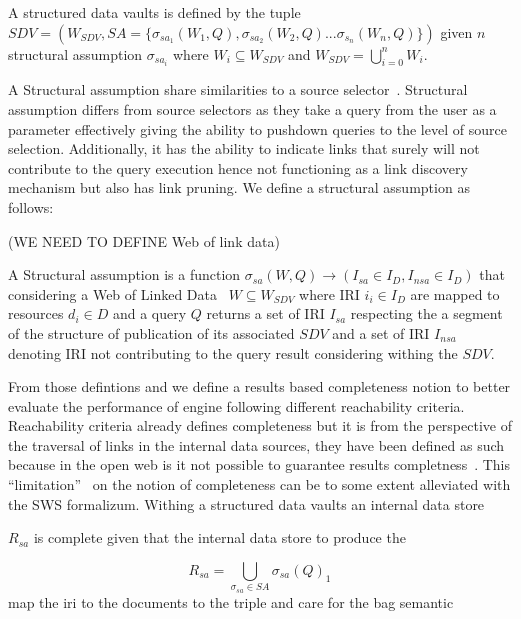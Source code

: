 \begin{definition}\label{def:structuredDataVaults}
A structured data vaults is defined by the tuple~\newline $SDV = (W_{SDV}, SA = \{\sigma_{sa_1}(W_1, Q), \sigma_{sa_2}(W_2, Q)...\sigma_{s_n}(W_n, Q)\})$ given 
$n$ structural assumption $\sigma_{sa_i}$ where $W_i  \subseteq W_{SDV}$ and $W_{SDV} = \bigcup_{i=0}^{n}W_i$.
\end{definition}

A Structural assumption share similarities to a source selector~\cite{Bogaerts2021LinkTW}.
Structural assumption differs from source selectors as they take a query from the user as a parameter
effectively giving the ability to pushdown queries to the level of source selection.
Additionally, it has the ability to indicate links that surely will not contribute to the query execution hence 
not functioning as a link discovery mechanism but also has link pruning.
We define a structural assumption as follows:

(WE NEED TO DEFINE Web of link data)
\begin{definition}\label{def:structuralAssumption}
A Structural assumption is a function $\sigma_{sa}(W,Q) \rightarrow (I_{sa}\in I_D, I_{nsa} \in I_D)$ that considering a Web of Linked Data~\cite{Bogaerts2021LinkTW} $W \subseteq W_{SDV}$ 
where IRI $i_i \in I_D$ are mapped to resources $d_i \in D$ and a query $Q$ returns a set of IRI $I_{sa}$ respecting the a segment of the structure of publication of 
its associated $SDV$ and a set of IRI $I_{nsa}$ denoting IRI not contributing to the query result considering withing the $SDV$.
\end{definition}

From those defintions and we define a results based completeness notion to better evaluate the performance of engine following different reachability criteria.
Reachability criteria already defines completeness but it is from the perspective of the traversal of links in the internal data sources,
they have been defined as such because in the open web is it not possible to guarantee results completness~\cite{Hartig2012}.
This ``limitation''~\cite{Hartig2012} on the notion of completeness can be to some extent alleviated with the SWS formalizum.
Withing a structured data vaults an internal data store 

$R_{sa}$ is complete given that the internal data store to produce the  

\begin{equation}
   R_{sa} = \bigcup_{\sigma_{sa} \in SA} \sigma_{sa}(Q)_1 
\end{equation}
map the iri to the documents to the triple and care for the bag semantic


